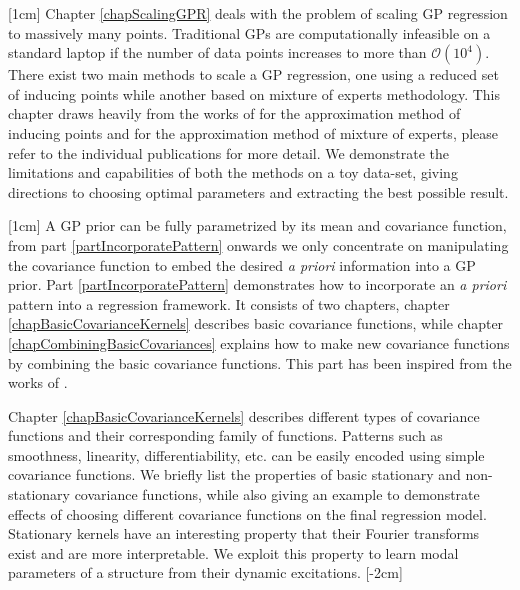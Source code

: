 [1cm]
Chapter \ref{chapScalingGPR} deals with the problem of scaling GP regression to massively many points. Traditional GPs are computationally infeasible on a standard laptop if the number of data points increases to more than $\mathcal{O}(10^4)$. There exist two main methods to scale a GP regression, one using a reduced set of inducing points while another based on mixture of experts methodology. This chapter draws heavily from the works of \cite{quinonero2005unifying, seeger2003fast, Snelson06sparsegaussian, Titsias09variationallearning} for the approximation method of inducing points and \cite{caoF14, tresp2000bayesian, chen2009bagging, deisenroth2015distributed} for the approximation method of mixture of experts, please refer to the individual publications for more detail. We demonstrate the limitations and capabilities of both the methods on a toy data-set, giving directions to choosing optimal parameters and extracting the best possible result.  

[1cm]
A GP prior can be fully parametrized by its mean and covariance function, from part \ref{partIncorporatePattern} onwards we only concentrate on manipulating the covariance function to embed the desired \textit{a priori} information into a GP prior. Part \ref{partIncorporatePattern} demonstrates how to incorporate an \textit{a priori} pattern into a regression framework. It consists of two chapters, chapter \ref{chapBasicCovarianceKernels} describes basic covariance functions, while chapter \ref{chapCombiningBasicCovariances} explains how to make new covariance functions by combining the basic covariance functions. This part has been inspired from the works of \cite{bishop2006pattern, mackay2003information, duvenaud-thesis-2014, wilson2014thesis, lloyd2014automatic, durrande2001etude, durrande2013anova}. 

Chapter \ref{chapBasicCovarianceKernels} describes different types of covariance functions and their corresponding family of functions. Patterns such as smoothness, linearity, differentiability, etc. can be easily encoded using simple covariance functions. We briefly list the properties of basic stationary and non-stationary covariance functions, while also giving an example to demonstrate effects of choosing different covariance functions on the final regression model. Stationary kernels have an interesting property that their Fourier transforms exist and are more interpretable. We exploit this property to learn modal parameters of a structure from their dynamic excitations. 
[-2cm]

